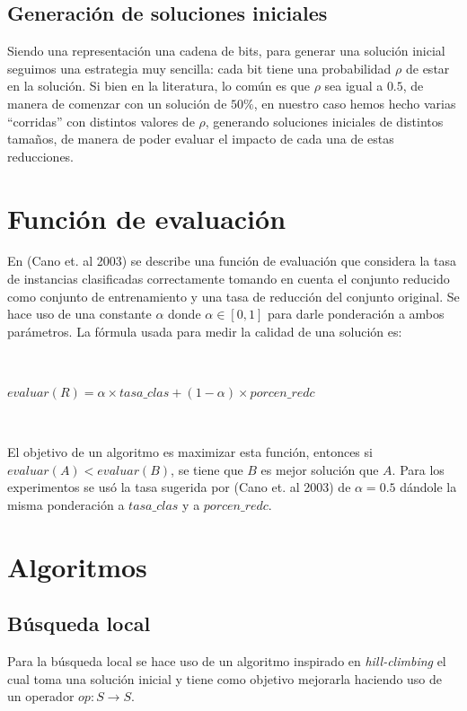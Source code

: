 \documentclass[11pt]{article}
\begin{document}
\subsection{Generación de soluciones iniciales}

Siendo una representación una cadena de bits, para generar una solución
inicial seguimos una estrategia muy sencilla: cada bit tiene una probabilidad $\rho$
de estar en la solución. Si bien en la literatura, lo común es
que $\rho$ sea igual a $0.5$, de manera de comenzar con un solución
de $50\%$, en nuestro caso hemos hecho varias ``corridas'' con distintos valores
de $\rho$, generando soluciones iniciales de distintos tamaños, de manera de poder
evaluar el impacto de cada una de estas reducciones.

\section{Función de evaluación}
En (Cano et. al 2003) se describe una función de evaluación que considera la tasa de instancias clasificadas correctamente tomando en cuenta el conjunto reducido como conjunto de entrenamiento y una tasa de reducción del conjunto original. Se hace uso de una constante $\alpha$ donde $\alpha \in [0,1]$ para darle ponderación a ambos parámetros. La fórmula usada para medir la calidad de una solución es:

~\

\begin{center}
    {\fontsize{10}{10}\selectfont
    $ evaluar(R) = \alpha \times tasa\_clas + (1 - \alpha) \times porcen\_redc $
    }
\end{center}

~\

El objetivo de un algoritmo es maximizar esta función, entonces si $evaluar(A) < evaluar(B)$, se tiene que $B$ es mejor solución que $A$. Para los experimentos se usó la tasa sugerida por (Cano et. al 2003) de $\alpha = 0.5$ dándole la misma ponderación a $tasa\_clas$ y a $porcen\_redc$.

\section{Algoritmos}

    \subsection{Búsqueda local}
    Para la búsqueda local se hace uso de un algoritmo inspirado en \emph{hill-climbing} el cual toma una solución inicial y tiene como objetivo mejorarla haciendo uso de un operador $op: S \to S$. \\
\end{document}

